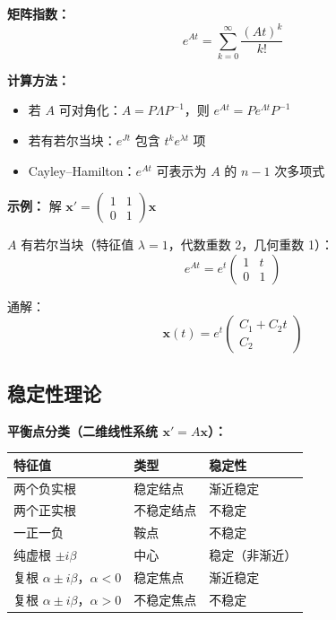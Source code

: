 \textbf{矩阵指数：}
\[
e^{At} = \sum_{k=0}^{\infty} \frac{(At)^k}{k!}
\]

\textbf{计算方法：}
\begin{itemize}
  \item 若 $A$ 可对角化：$A = P\Lambda P^{-1}$，则 $e^{At} = Pe^{\Lambda t}P^{-1}$
  \item 若有若尔当块：$e^{Jt}$ 包含 $t^k e^{\lambda t}$ 项
  \item Cayley--Hamilton：$e^{At}$ 可表示为 $A$ 的 $n-1$ 次多项式
\end{itemize}

\textbf{示例：} 解 $\mathbf{x}' = \begin{pmatrix} 1 & 1 \\ 0 & 1 \end{pmatrix}\mathbf{x}$

$A$ 有若尔当块（特征值 $\lambda = 1$，代数重数 2，几何重数 1）：
\[
e^{At} = e^t \begin{pmatrix} 1 & t \\ 0 & 1 \end{pmatrix}
\]

通解：
\[
\mathbf{x}(t) = e^t \begin{pmatrix} C_1 + C_2 t \\ C_2 \end{pmatrix}
\]

\subsection{稳定性理论}

\textbf{平衡点分类（二维线性系统 $\mathbf{x}' = A\mathbf{x}$）：}

\begin{center}
\begin{tabular}{L{3.5cm}L{3cm}L{3cm}}
\toprule
\textbf{特征值} & \textbf{类型} & \textbf{稳定性} \\
\midrule
两个负实根 & 稳定结点 & 渐近稳定 \\
两个正实根 & 不稳定结点 & 不稳定 \\
一正一负 & 鞍点 & 不稳定 \\
纯虚根 $\pm i\beta$ & 中心 & 稳定（非渐近） \\
复根 $\alpha \pm i\beta$，$\alpha < 0$ & 稳定焦点 & 渐近稳定 \\
复根 $\alpha \pm i\beta$，$\alpha > 0$ & 不稳定焦点 & 不稳定 \\
\bottomrule
\end{tabular}
\end{center}

